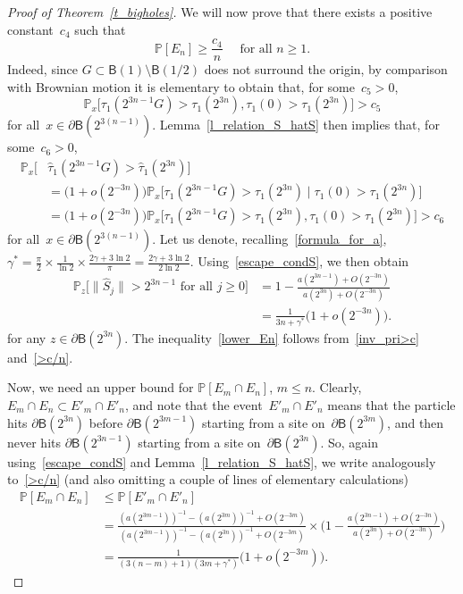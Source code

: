 \documentclass[10pt]{amsart}
\theoremstyle{definition}\newtheorem{defi}[theo]{Definition}\newtheorem{rema}[theo]{Remark}\newtheorem{exam}[theo]{Example}\newtheorem{exem}[theo]{Example}\newtheorem{nota}[theo]{Notation}
\newcommand{\1}[1]{{\mathbf 1}{\{#1\}}}
\newcommand{\s}{{\widehat S}}
\newcommand{\8}{{\infty}}
\newcommand{\IP}{{\mathbb P}}
\newcommand{\htau}{\widehat{\tau}}
\newcommand{\B}{{\mathsf B}}
\begin{document}
\begin{proof}[Proof of Theorem~\ref{t_bigholes}]
We will now prove that there exists a positive constant~$c_4$ such that
\begin{equation}\label{lower_En}
\IP[E_n] \geq \frac{c_4}{n} \quad \text{ for all }n\geq 1.
\end{equation}
Indeed, since $G\subset\B(1)\setminus \B(1/2)$ does not surround the origin, by comparison with Brownian motion it is elementary to obtain that, for some~$c_5>0$,
\[
\IP_x\big[\tau_1(2^{3n-1}G)>\tau_1(2^{3n}),
\tau_1(0)>\tau_1(2^{3n}) \big] > c_5
\]
for all~$x\in\partial \B(2^{3(n-1)})$. Lemma~\ref{l_relation_S_hatS} then implies that, for some~$c_6>0$,
\begin{align}
\IP_x\big[&\htau_1(2^{3n-1}G)>\htau_1(2^{3n})\big]\nonumber\\
&= \big(1+o(2^{-3n})\big)
\IP_x\big[\tau_1(2^{3n-1}G)>\tau_1(2^{3n})
\mid \tau_1(0)>\tau_1(2^{3n})\big] \nonumber\\
&= \big(1+o(2^{-3n})\big)
\IP_x\big[\tau_1(2^{3n-1}G)>\tau_1(2^{3n}),
\tau_1(0)>\tau_1(2^{3n})\big] > c_6\label{inv_pri>c}
\end{align}
for all~$x\in\partial \B(2^{3(n-1)})$. Let us denote, recalling~\eqref{formula_for_a}, $\gamma^{*}=\frac{\pi}{2}\times\frac{1}{\ln 2} \times
\frac{2\gamma+ 3\ln 2}{\pi} =\frac{2\gamma+ 3\ln 2}{2\ln 2}$. Using~\eqref{escape_condS}, we then obtain
\begin{align}
\IP_z\big[\|\s_j\| > 2^{3n-1} \text{ for all } j\geq 0\big] & = 1- \frac{a(2^{3n-1})+O(2^{-3n})}{a(2^{3n})+O(2^{-3n})}
\nonumber\\
&= \frac{1}{3n+\gamma^{*}}\big(1+o(2^{-3n})\big).\label{>c/n}
\end{align}
for any $z\in\partial \B(2^{3n})$. The inequality~\eqref{lower_En} follows from~\eqref{inv_pri>c} and~\eqref{>c/n}.

Now, we need an upper bound for $\IP[E_m\cap E_n]$, $m\leq n$. Clearly, $E_m \cap E_n\subset E'_m \cap E'_n$, and note that the event~$E'_m \cap E'_n$ means that the particle hits $\partial\B(2^{3n})$ before $\partial\B(2^{3m-1})$ starting from a site on~$\partial\B(2^{3m})$, and then never hits $\partial\B(2^{3n-1})$ starting from a site on~$\partial\B(2^{3n})$. So, again using~\eqref{escape_condS} and Lemma~\ref{l_relation_S_hatS}, we write analogously to~\eqref{>c/n} (and also omitting a couple of lines of elementary calculations)
\begin{align}
\IP[E_m \cap E_n] & \leq \IP[E'_m \cap E'_n]\nonumber\\
& = \frac{(a(2^{3m-1}))^{-1}-(a(2^{3m}))^{-1}+O(2^{-3m})} {(a(2^{3m-1}))^{-1}-(a(2^{3n}))^{-1}+O(2^{-3m})}
\times \Big(1- \frac{a(2^{3n-1})+O(2^{-3n})}{a(2^{3n})+O(2^{-3n})}\Big)
\nonumber\\
& = \frac{1}{(3(n-m)+1)(3m+\gamma^{*})}\big(1+o(2^{-3m})\big).\label{EmEn_upper}
\end{align}


\end{proof}
\end{document}
